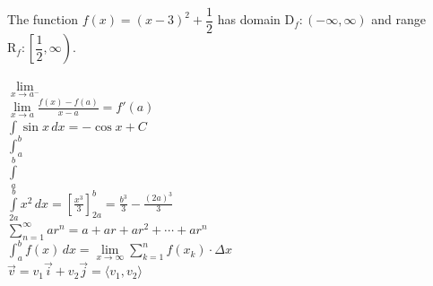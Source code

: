 \documentclass[11pt]{article}
\begin{document}
The function $f(x)=(x-3)^2+\dfrac{1}{2}$ has domain $\mathrm{D}_f:(-\infty, \infty)$ and range $\mathrm{R}_f:\left [\dfrac{1}{2}, \infty \right)$.

$\lim \limits_{x \to a^-}$\\

$\displaystyle{\lim \limits_{x \to a} \frac{f(x)-f(a)}{x-a}=f'(a)}$\\

$\displaystyle{\int \sin x \, dx = -\cos x + C}$\\

$\int_a^b$\\

$\int \limits_a^b$\\

$\displaystyle{\int \limits_{2a}^b x^2 \, dx = \left [\frac{x^3}{3} \right ]_{2a}^b} = \frac{b^3}{3} - \frac{(2a)^3}{3}$\\

$\displaystyle{\sum \limits_{n=1}^{\infty} ar^n = a + ar + ar^2 + \cdots + ar^n}$\\

$\displaystyle{\int_a^b f(x) \, dx = \lim \limits_{x \to \infty} \sum \limits_{k=1}^n f(x_k) \cdot \Delta x}$\\

$\vec{v} = v_1 \vec{i} + v_2 \vec{j} = \langle v_1, v_2 \rangle$
\end{document}
